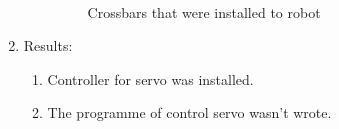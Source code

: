 \begin{enumerate}
\begin{enumerate}
      \begin{figure}[H]
      	\begin{minipage}[h]{1\linewidth}
      		\caption{Crossbars that were installed to robot} 
      	\end{minipage}
      \end{figure}
      
    \end{enumerate}
    
	\item Results: 
	\begin{enumerate}
	  \item Controller for servo was installed.
	  
      \item The programme of control servo wasn't wrote.
      

\end{enumerate}
\end{enumerate}

